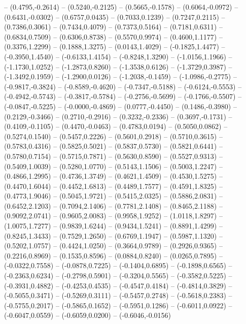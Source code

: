 {	-- (0.4795,-0.2614)
	-- (0.5240,-0.2125)
	-- (0.5665,-0.1578)
	-- (0.6064,-0.0972)
	-- (0.6431,-0.0302)
	-- (0.6757,0.0435)
	-- (0.7033,0.1239)
	-- (0.7247,0.2115)
	-- (0.7386,0.3061)
	-- (0.7434,0.4079)
	-- (0.7373,0.5164)
	-- (0.7181,0.6311)
	-- (0.6834,0.7509)
	-- (0.6306,0.8738)
	-- (0.5570,0.9974)
	-- (0.4600,1.1177)
	-- (0.3376,1.2299)
	-- (0.1888,1.3275)
	-- (0.0143,1.4029)
	-- (-0.1825,1.4477)
	-- (-0.3950,1.4540)
	-- (-0.6133,1.4154)
	-- (-0.8248,1.3290)
	-- (-1.0156,1.1966)
	-- (-1.1730,1.0252)
	-- (-1.2873,0.8260)
	-- (-1.3538,0.6126)
	-- (-1.3729,0.3987)
	-- (-1.3492,0.1959)
	-- (-1.2900,0.0126)
	-- (-1.2038,-0.1459)
	-- (-1.0986,-0.2775)
	-- (-0.9817,-0.3824)
	-- (-0.8589,-0.4620)
	-- (-0.7347,-0.5188)
	-- (-0.6124,-0.5553)
	-- (-0.4942,-0.5743)
	-- (-0.3817,-0.5784)
	-- (-0.2756,-0.5699)
	-- (-0.1766,-0.5507)
	-- (-0.0847,-0.5225)
	-- (-0.0000,-0.4869)
	-- (0.0777,-0.4450)
	-- (0.1486,-0.3980)
	-- (0.2129,-0.3466)
	-- (0.2710,-0.2916)
	-- (0.3232,-0.2336)
	-- (0.3697,-0.1731)
	-- (0.4109,-0.1105)
	-- (0.4470,-0.0463)
	-- (0.4783,0.0194)
	-- (0.5050,0.0862)
	-- (0.5274,0.1540)
	-- (0.5457,0.2226)
	-- (0.5601,0.2918)
	-- (0.5710,0.3615)
	-- (0.5783,0.4316)
	-- (0.5825,0.5021)
	-- (0.5837,0.5730)
	-- (0.5821,0.6441)
	-- (0.5780,0.7154)
	-- (0.5715,0.7871)
	-- (0.5630,0.8590)
	-- (0.5527,0.9313)
	-- (0.5409,1.0039)
	-- (0.5280,1.0770)
	-- (0.5143,1.1506)
	-- (0.5003,1.2247)
	-- (0.4866,1.2995)
	-- (0.4736,1.3749)
	-- (0.4621,1.4509)
	-- (0.4530,1.5275)
	-- (0.4470,1.6044)
	-- (0.4452,1.6813)
	-- (0.4489,1.7577)
	-- (0.4591,1.8325)
	-- (0.4773,1.9046)
	-- (0.5045,1.9721)
	-- (0.5415,2.0325)
	-- (0.5886,2.0831)
	-- (0.6452,2.1203)
	-- (0.7094,2.1406)
	-- (0.7781,2.1408)
	-- (0.8465,2.1188)
	-- (0.9092,2.0741)
	-- (0.9605,2.0083)
	-- (0.9958,1.9252)
	-- (1.0118,1.8297)
	-- (1.0075,1.7277)
	-- (0.9839,1.6244)
	-- (0.9434,1.5241)
	-- (0.8891,1.4299)
	-- (0.8245,1.3433)
	-- (0.7529,1.2650)
	-- (0.6769,1.1947)
	-- (0.5987,1.1320)
	-- (0.5202,1.0757)
	-- (0.4424,1.0250)
	-- (0.3664,0.9789)
	-- (0.2926,0.9365)
	-- (0.2216,0.8969)
	-- (0.1535,0.8596)
	-- (0.0884,0.8240)
	-- (0.0265,0.7895)
	-- (-0.0322,0.7558)
	-- (-0.0878,0.7225)
	-- (-0.1404,0.6895)
	-- (-0.1898,0.6565)
	-- (-0.2363,0.6234)
	-- (-0.2798,0.5901)
	-- (-0.3204,0.5565)
	-- (-0.3582,0.5225)
	-- (-0.3931,0.4882)
	-- (-0.4253,0.4535)
	-- (-0.4547,0.4184)
	-- (-0.4814,0.3829)
	-- (-0.5055,0.3471)
	-- (-0.5269,0.3111)
	-- (-0.5457,0.2748)
	-- (-0.5618,0.2383)
	-- (-0.5755,0.2017)
	-- (-0.5865,0.1652)
	-- (-0.5951,0.1286)
	-- (-0.6011,0.0922)
	-- (-0.6047,0.0559)
	-- (-0.6059,0.0200)
	-- (-0.6046,-0.0156)
}
